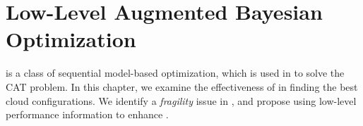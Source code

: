 \chapter{Low-Level Augmented Bayesian Optimization}
\label{chapter:arrow}

\bo is a class of sequential model-based optimization, which
is used in \cherrypick to solve the CAT problem.
In this chapter, we examine the effectiveness of \bo
in finding the best cloud configurations.
We identify a \emph{fragility} issue in \naive \bo 
, and propose using low-level performance information
to enhance \bo.


%






%
%
%
%
